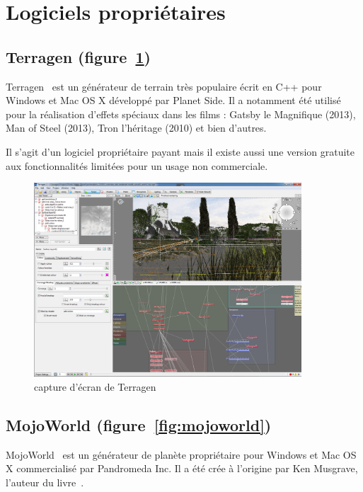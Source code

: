 \newpage
\section{Logiciels propriétaires}
\subsection{Terragen (figure~\ref{fig:terragen})}
Terragen~\cite{Terragen} est un générateur de terrain très populaire écrit en C++  pour Windows et Mac OS X développé par Planet Side. Il a notamment été utilisé pour la réalisation d'effets spéciaux dans les films : Gatsby le Magnifique (2013), Man of Steel (2013), Tron l'héritage (2010) et bien d'autres.

Il s'agit d'un logiciel propriétaire payant mais il existe aussi une version gratuite aux fonctionnalités limitées pour un usage non commerciale.

\begin{figure}[!ht]
    \begin{center}
        \includegraphics[width=10cm]{resources/terragen.jpg}
        \caption{capture d'écran de Terragen}
        \label{fig:terragen}
    \end{center}
\end{figure}

\subsection{MojoWorld (figure~\ref{fig:mojoworld})}
MojoWorld~\cite{Mojoworld} est un générateur de planète propriétaire pour Windows et Mac OS X
commercialisé par Pandromeda Inc.
Il a été crée à l'origine par Ken Musgrave, l'auteur du livre~\cite{Eber02}.

